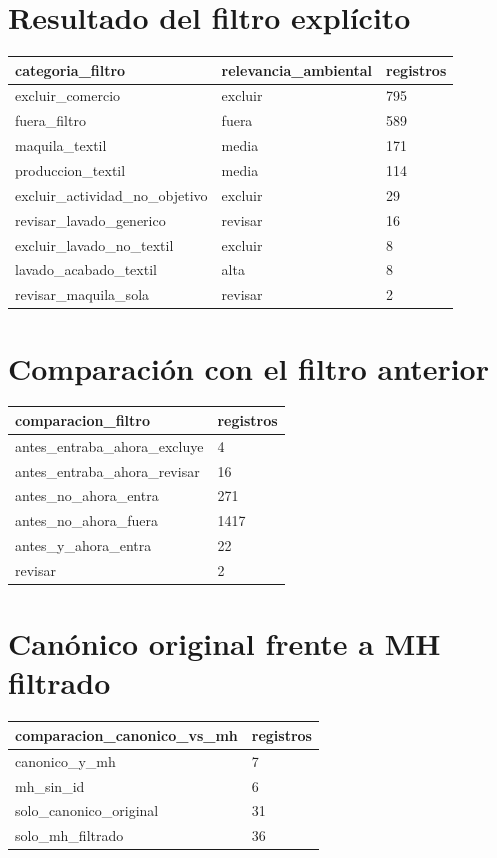 \documentclass[11pt]{article}
\begin{document}
\section{Resultado del filtro explícito}

\begin{tabular}{lll}
\toprule
categoria\_filtro & relevancia\_ambiental & registros \\
\midrule
excluir\_comercio & excluir & 795 \\
fuera\_filtro & fuera & 589 \\
maquila\_textil & media & 171 \\
produccion\_textil & media & 114 \\
excluir\_actividad\_no\_objetivo & excluir & 29 \\
revisar\_lavado\_generico & revisar & 16 \\
excluir\_lavado\_no\_textil & excluir & 8 \\
lavado\_acabado\_textil & alta & 8 \\
revisar\_maquila\_sola & revisar & 2 \\
\bottomrule
\end{tabular}

\section{Comparación con el filtro anterior}

\begin{tabular}{ll}
\toprule
comparacion\_filtro & registros \\
\midrule
antes\_entraba\_ahora\_excluye & 4 \\
antes\_entraba\_ahora\_revisar & 16 \\
antes\_no\_ahora\_entra & 271 \\
antes\_no\_ahora\_fuera & 1417 \\
antes\_y\_ahora\_entra & 22 \\
revisar & 2 \\
\bottomrule
\end{tabular}

\section{Canónico original frente a MH filtrado}

\begin{tabular}{ll}
\toprule
comparacion\_canonico\_vs\_mh & registros \\
\midrule
canonico\_y\_mh & 7 \\
mh\_sin\_id & 6 \\
solo\_canonico\_original & 31 \\
solo\_mh\_filtrado & 36 \\
\bottomrule
\end{tabular}
\end{document}
